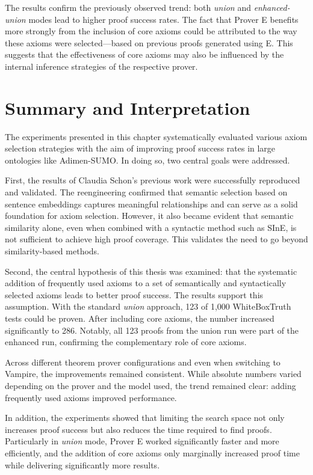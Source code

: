 \documentclass[english,version-2020-11]{uzl-thesis}
\begin{document}
The results confirm the previously observed trend: both \textit{union} and \textit{enhanced-union} modes lead to higher proof success rates. The fact that Prover E benefits more strongly from the inclusion of core axioms could be attributed to the way these axioms were selected—based on previous proofs generated using E. This suggests that the effectiveness of core axioms may also be influenced by the internal inference strategies of the respective prover.

\section{Summary and Interpretation}

The experiments presented in this chapter systematically evaluated various axiom selection strategies with the aim of improving proof success rates in large ontologies like Adimen-SUMO. In doing so, two central goals were addressed.

First, the results of Claudia Schon's previous work were successfully reproduced and validated. The reengineering confirmed that semantic selection based on sentence embeddings captures meaningful relationships and can serve as a solid foundation for axiom selection. However, it also became evident that semantic similarity alone, even when combined with a syntactic method such as SInE, is not sufficient to achieve high proof coverage. This validates the need to go beyond similarity-based methods.

Second, the central hypothesis of this thesis was examined: that the systematic addition of frequently used axioms to a set of semantically and syntactically selected axioms leads to better proof success. The results support this assumption. With the standard \textit{union} approach, 123 of 1,000 WhiteBoxTruth tests could be proven. After including core axioms, the number increased significantly to 286. Notably, all 123 proofs from the union run were part of the enhanced run, confirming the complementary role of core axioms.

Across different theorem prover configurations and even when switching to Vampire, the improvements remained consistent. While absolute numbers varied depending on the prover and the model used, the trend remained clear: adding frequently used axioms improved performance.

In addition, the experiments showed that limiting the search space not only increases proof success but also reduces the time required to find proofs. Particularly in \textit{union} mode, Prover E worked significantly faster and more efficiently, and the addition of core axioms only marginally increased proof time while delivering significantly more results.
\end{document}
